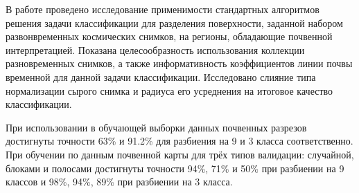 \documentclass[14pt]{extarticle}
\begin{document}
\par
В работе проведено исследование применимости стандартных алгоритмов решения задачи классификации
для разделения поверхности, заданной набором развонвременных космических снимков, на регионы,
обладающие почвенной интерпретацией. Показана целесообразность использования коллекции
разновременных снимков, а также информативность коэффициентов линии почвы временной для
данной задачи классификации. Исследовано слияние типа нормализации сырого снимка
и радиуса его усреднения на итоговое качество классификации.
\par
При использовании в обучающей выборки данных почвенных разрезов достигнуты точности 63\% и 
91.2\% для разбиения на 9 и 3 класса соответственно. При обучении по данным почвенной карты
для трёх типов валидации: случайной, блоками и полосами достигнуты точности 94\%, 71\% и 50\%
при разбиении на 9 классов и 98\%, 94\%, 89\% при разбиении на 3 класса.
\end{document}

